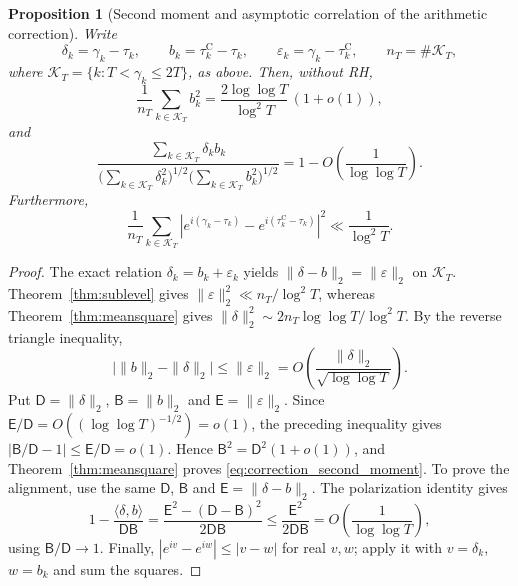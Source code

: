 \documentclass[11pt,a4paper]{article}
\makeatletter
\numberwithin{equation}{section}
\DeclareRobustCommand{\CGref}[1]{\ref{#1}}
\DeclareRobustCommand{\CGeqref}[1]{\eqref{#1}}
\let\CG@origref\ref
\let\CG@origeqref\eqref
\newcommand{\CG@gettip}[1]{\@ifundefined{CGTip@#1}{#1}{\csname CGTip@#1\endcsname}}
\DeclareRobustCommand{\CGref}[1]{\pdftooltip{\CG@origref{#1}}{\CG@gettip{#1}}}
\DeclareRobustCommand{\CGeqref}[1]{\pdftooltip{\CG@origeqref{#1}}{\CG@gettip{#1}}}
\newtheorem{proposition}[theorem]{Proposition}
\theoremstyle{definition}
\theoremstyle{remark}
\makeatother
\begin{document}
\begin{proposition}[Second moment and asymptotic correlation of the arithmetic correction]\label{prop:correction_second_moment}
Write
\begin{equation}
\delta_k=\gamma_k-\tau_k,\qquad
b_k=\tau_k^{\mathrm C}-\tau_k,\qquad
\varepsilon_k=\gamma_k-\tau_k^{\mathrm C},\qquad
n_T=\#\mathcal K_T,
\label{eq:disp_37}
\end{equation}
where $\mathcal K_T=\{k:T<\gamma_k\le2T\}$, as above. Then, without RH,
\begin{equation}
\frac1{n_T}\sum_{k\in\mathcal K_T}b_k^2
=\frac{2\log\log T}{\log^2T}\,(1+o(1)),
\label{eq:correction_second_moment}
\end{equation}
and
\begin{equation}
\frac{\sum_{k\in\mathcal K_T}\delta_kb_k}
{\bigl(\sum_{k\in\mathcal K_T}\delta_k^2\bigr)^{1/2}
 \bigl(\sum_{k\in\mathcal K_T}b_k^2\bigr)^{1/2}}
=1-O\!\left(\frac1{\log\log T}\right).
\label{eq:correction_alignment}
\end{equation}
Furthermore,
\begin{equation}
\frac1{n_T}\sum_{k\in\mathcal K_T}
\left|e^{i(\gamma_k-\tau_k)}-e^{i(\tau_k^{\mathrm C}-\tau_k)}\right|^2
\ll\frac1{\log^2T}.
\label{eq:correction_phases}
\end{equation}
\end{proposition}
\begin{proof}
The exact relation $\delta_k=b_k+\varepsilon_k$ yields
$\|\delta-b\|_2=\|\varepsilon\|_2$ on $\mathcal K_T$.
Theorem~\CGref{thm:sublevel} gives
$\|\varepsilon\|_2^2\ll n_T/\log^2T$, whereas
Theorem~\CGref{thm:meansquare} gives
$\|\delta\|_2^2\sim2n_T\log\log T/\log^2T$.
By the reverse triangle inequality,
\begin{equation}
\bigl|\|b\|_2-\|\delta\|_2\bigr|
\le\|\varepsilon\|_2
=O\!\left(\frac{\|\delta\|_2}{\sqrt{\log\log T}}\right).
\label{eq:disp_38}
\end{equation}
Put $\mathsf D=\|\delta\|_2$, $\mathsf B=\|b\|_2$ and $\mathsf E=\|\varepsilon\|_2$. Since $\mathsf E/\mathsf D=O((\log\log T)^{-1/2})=o(1)$, the preceding inequality gives $|\mathsf B/\mathsf D-1|\le \mathsf E/\mathsf D=o(1)$. Hence $\mathsf B^2=\mathsf D^2(1+o(1))$, and Theorem~\CGref{thm:meansquare} proves \CGeqref{eq:correction_second_moment}.
To prove the alignment, use the same $\mathsf D$, $\mathsf B$ and $\mathsf E=\|\delta-b\|_2$.
The polarization identity gives
\begin{equation}
1-\frac{\langle\delta,b\rangle}{\mathsf D\mathsf B}
=\frac{\mathsf E^2-(\mathsf D-\mathsf B)^2}{2\mathsf D\mathsf B}
\le\frac{\mathsf E^2}{2\mathsf D\mathsf B}
=O\!\left(\frac1{\log\log T}\right),
\label{eq:disp_39}
\end{equation}
using $\mathsf B/\mathsf D\to1$.
Finally, $|e^{iv}-e^{iw}|\le|v-w|$ for real $v,w$; apply it with
$v=\delta_k$, $w=b_k$ and sum the squares.
\end{proof}
\end{document}
